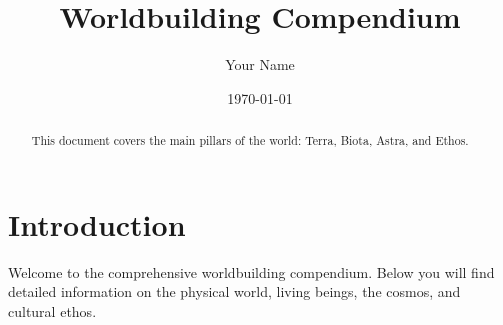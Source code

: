 \documentclass[12pt]{article}
\begin{document}
\title{Worldbuilding Compendium}
\author{Your Name}
\date{\today}
\maketitle

\begin{abstract}
This document covers the main pillars of the world: Terra, Biota, Astra, and Ethos.
\end{abstract}

\section*{Introduction}
Welcome to the comprehensive worldbuilding compendium. Below you will find detailed information on the physical world, living beings, the cosmos, and cultural ethos.

\bigskip


\end{document}

